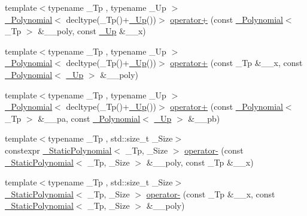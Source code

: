 \begin{DoxyCompactItemize}
\item 
{\footnotesize template$<$typename \+\_\+\+Tp , typename \+\_\+\+Up $>$ }\\\hyperlink{class____gnu__cxx_1_1__Polynomial}{\+\_\+\+Polynomial}$<$ decltype(\+\_\+\+Tp()+\hyperlink{namespace____gnu__cxx_ab693ea357b6429b331e0bf09f9442385}{\+\_\+\+Up}())$>$ \hyperlink{namespace____gnu__cxx_a2b408e7a7e5d2ec6879b8e40f7f5de3e}{operator+} (const \hyperlink{class____gnu__cxx_1_1__Polynomial}{\+\_\+\+Polynomial}$<$ \+\_\+\+Tp $>$ \&\+\_\+\+\_\+poly, const \hyperlink{namespace____gnu__cxx_ab693ea357b6429b331e0bf09f9442385}{\+\_\+\+Up} \&\+\_\+\+\_\+x)
\item 
{\footnotesize template$<$typename \+\_\+\+Tp , typename \+\_\+\+Up $>$ }\\\hyperlink{class____gnu__cxx_1_1__Polynomial}{\+\_\+\+Polynomial}$<$ decltype(\+\_\+\+Tp()+\hyperlink{namespace____gnu__cxx_ab693ea357b6429b331e0bf09f9442385}{\+\_\+\+Up}())$>$ \hyperlink{namespace____gnu__cxx_ac9f58ced995b65628b5715c885569cb7}{operator+} (const \+\_\+\+Tp \&\+\_\+\+\_\+x, const \hyperlink{class____gnu__cxx_1_1__Polynomial}{\+\_\+\+Polynomial}$<$ \hyperlink{namespace____gnu__cxx_ab693ea357b6429b331e0bf09f9442385}{\+\_\+\+Up} $>$ \&\+\_\+\+\_\+poly)
\item 
{\footnotesize template$<$typename \+\_\+\+Tp , typename \+\_\+\+Up $>$ }\\\hyperlink{class____gnu__cxx_1_1__Polynomial}{\+\_\+\+Polynomial}$<$ decltype(\+\_\+\+Tp()+\hyperlink{namespace____gnu__cxx_ab693ea357b6429b331e0bf09f9442385}{\+\_\+\+Up}())$>$ \hyperlink{namespace____gnu__cxx_ada8a28005b5f71563bec55c71e03029b}{operator+} (const \hyperlink{class____gnu__cxx_1_1__Polynomial}{\+\_\+\+Polynomial}$<$ \+\_\+\+Tp $>$ \&\+\_\+\+\_\+pa, const \hyperlink{class____gnu__cxx_1_1__Polynomial}{\+\_\+\+Polynomial}$<$ \hyperlink{namespace____gnu__cxx_ab693ea357b6429b331e0bf09f9442385}{\+\_\+\+Up} $>$ \&\+\_\+\+\_\+pb)
\item 
{\footnotesize template$<$typename \+\_\+\+Tp , std\+::size\+\_\+t \+\_\+\+Size$>$ }\\constexpr \hyperlink{class____gnu__cxx_1_1__StaticPolynomial}{\+\_\+\+Static\+Polynomial}$<$ \+\_\+\+Tp, \+\_\+\+Size $>$ \hyperlink{namespace____gnu__cxx_a9f3b5d6e3db0c359eb0c8c067fc9ae05}{operator-\/} (const \hyperlink{class____gnu__cxx_1_1__StaticPolynomial}{\+\_\+\+Static\+Polynomial}$<$ \+\_\+\+Tp, \+\_\+\+Size $>$ \&\+\_\+\+\_\+poly, const \+\_\+\+Tp \&\+\_\+\+\_\+x)
\item 
{\footnotesize template$<$typename \+\_\+\+Tp , std\+::size\+\_\+t \+\_\+\+Size$>$ }\\\hyperlink{class____gnu__cxx_1_1__StaticPolynomial}{\+\_\+\+Static\+Polynomial}$<$ \+\_\+\+Tp, \+\_\+\+Size $>$ \hyperlink{namespace____gnu__cxx_a6bc4eecdfefce0b2dea328cb6cc5412a}{operator-\/} (const \+\_\+\+Tp \&\+\_\+\+\_\+x, const \hyperlink{class____gnu__cxx_1_1__StaticPolynomial}{\+\_\+\+Static\+Polynomial}$<$ \+\_\+\+Tp, \+\_\+\+Size $>$ \&\+\_\+\+\_\+poly)

\end{DoxyCompactItemize}
